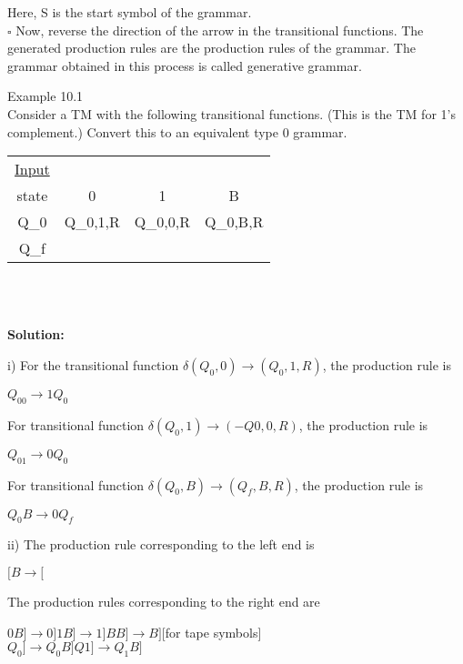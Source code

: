 \documentclass[b5paper,10pt]{article}
\begin{document}
\quad Here, S is the start symbol of the grammar.\\

$\square$ Now, reverse the direction of the arrow in the transitional functions. The generated production rules are the production rules of the grammar. The grammar obtained in this process is called generative grammar.

Example 10.1\\

Consider a TM with the following transitional functions. (This is the TM for 1’s complement.) Convert this to an equivalent type 0 grammar.
\begin{table}[htp]
\centering 
\begin{tabular}{c c c c}
     \hline
     \underline{Input}   &       &      &  \\
     state & 0 &  1  &  B \\
     \hline
     Q_0 &  Q_0,1,R &  Q_0,0,R   & Q_0,B,R  \\
     Q_f  & & & \\
     
     \hline
\end{tabular}\\
\end{table}\\
\textbf{ Solution:}

i) For the transitional function $\delta (Q_0, 0) \rightarrow (Q_0, 1, R)$, the production rule is
\begin{center}
$Q_00 \rightarrow 1Q_0$\\
\end{center}

For transitional function $\delta (Q_0, 1) \rightarrow (-Q0, 0, R)$, the production rule is
\begin{center}
$Q_01 \rightarrow 0Q_0$\\
\end{center}

For transitional function $\delta (Q_0, B) \rightarrow (Q_f, B, R)$, the production rule is
\begin{center}
$Q_0B \rightarrow 0Q_f$\\
\end{center}

ii) The production rule corresponding to the left end is
\begin{center}
$[B \rightarrow [$\\
\end{center}

The production rules corresponding to the right end are
\begin{center}
$0B]\rightarrow 0] 1B]\rightarrow 1] BB] \rightarrow B] $[for tape symbols]\\
$Q_0] \rightarrow Q_0B] Q1] \rightarrow Q_1B]$\\
\end{center}
\end{document}
